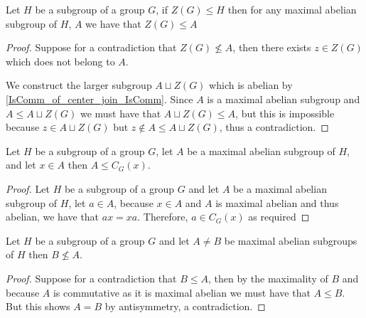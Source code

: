 \begin{lemma}
  \label{MaximalAbelianSubgroup.center_le}
  Let $H$ be a subgroup of a group $G$, if $Z(G) \le H$ then for any maximal abelian subgroup of $H$, $A$ we have that $Z(G) \le A$ 
  \leanok
\end{lemma}
\begin{proof}
  \leanok

  Suppose for a contradiction that $Z(G) \not\le A$, then there exists $z \in Z(G)$ which does not belong to $A$.

  We construct the larger subgroup $A \sqcup Z(G)$ which is abelian by \ref{IsComm_of_center_join_IsComm}. Since 
  $A$ is a maximal abelian subgroup and $A \le A \sqcup Z(G)$ we must have that $A \sqcup Z(G) \le A$, but this is impossible 
  because $z \in A \sqcup Z(G)$ but $z \notin A \le A \sqcup Z(G)$, thus a contradiction.
\end{proof}


\begin{lemma}
\label{MaximalAbelianSubgroup.le_centralizer_of_mem}
\leanok
Let $H$ be a subgroup of a group $G$, let $A$ be a maximal abelian subgroup of $H$, and let $x \in A$ then $A \le C_G(x)$.
\end{lemma}
\begin{proof}
  \leanok
  Let $H$ be a subgroup of a group $G$ and let $A$ be a maximal abelian subgroup of $H$, let $a \in A$,
  because $x \in A$ and $A$ is maximal abelian and thus abelian, we have that $a x = x a$. 
  Therefore, $a \in C_G(x)$ as required
\end{proof}


\begin{lemma}
  \label{MaximalAbelianSubgroup.not_le_of_ne}
  \leanok
  Let $H$ be a subgroup of a group $G$ and let $A \ne B$ be maximal abelian subgroups of $H$ then $B \not\le A$.
\end{lemma}
\begin{proof}
  \leanok
Suppose for a contradiction that $B \le A$, then by the maximality of $B$ and because $A$ is commutative as it is maximal abelian we must have that $A \le B$.
But this shows $A = B$ by antisymmetry, a contradiction.
\end{proof}


